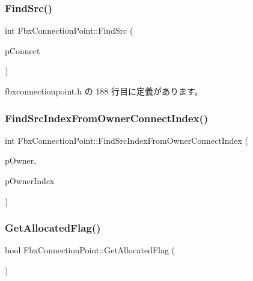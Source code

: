 \subsubsection{\texorpdfstring{Find\+Src()}{FindSrc()}}
{\footnotesize\ttfamily int Fbx\+Connection\+Point\+::\+Find\+Src (\begin{DoxyParamCaption}\item[{\hyperlink{class_fbx_connection_point}{Fbx\+Connection\+Point} $\ast$}]{p\+Connect }\end{DoxyParamCaption})\hspace{0.3cm}{\ttfamily [inline]}}



 fbxconnectionpoint.\+h の 188 行目に定義があります。

\mbox{\label{class_fbx_connection_point_a5161119d009ab1ab080bd896f0d40346}} 
\subsubsection{\texorpdfstring{Find\+Src\+Index\+From\+Owner\+Connect\+Index()}{FindSrcIndexFromOwnerConnectIndex()}}
{\footnotesize\ttfamily int Fbx\+Connection\+Point\+::\+Find\+Src\+Index\+From\+Owner\+Connect\+Index (\begin{DoxyParamCaption}\item[{\hyperlink{class_fbx_connection_point}{Fbx\+Connection\+Point} $\ast$}]{p\+Owner,  }\item[{int}]{p\+Owner\+Index }\end{DoxyParamCaption})\hspace{0.3cm}{\ttfamily [protected]}}

\mbox{\label{class_fbx_connection_point_a8c13e1874629e6c535e0051dba26b256}} 
\subsubsection{\texorpdfstring{Get\+Allocated\+Flag()}{GetAllocatedFlag()}}
{\footnotesize\ttfamily bool Fbx\+Connection\+Point\+::\+Get\+Allocated\+Flag (\begin{DoxyParamCaption}{ }\end{DoxyParamCaption})\hspace{0.3cm}{\ttfamily [inline]}}



